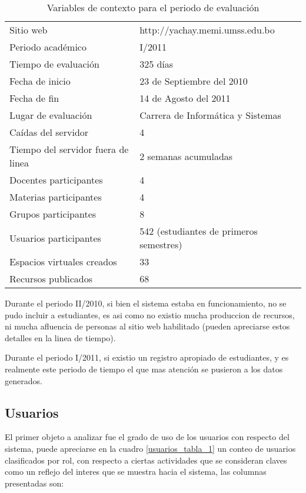 \begin{table}
\centering
\begin{tabular}{|l|l|}
\hline
Sitio web                          & http://yachay.memi.umss.edu.bo \\
Periodo académico                  & I/2011 \\
Tiempo de evaluación               & 325 días \\
Fecha de inicio                    & 23 de Septiembre del 2010 \\
Fecha de fin                       & 14 de Agosto del 2011 \\
Lugar de evaluación                & Carrera de Informática y Sistemas \\
Caídas del servidor                & 4 \\
Tiempo del servidor fuera de linea & 2 semanas acumuladas \\
Docentes participantes             & 4 \\
Materias participantes             & 4 \\
Grupos participantes               & 8 \\
Usuarios participantes             & 542 (estudiantes de primeros semestres) \\
Espacios virtuales creados         & 33 \\
Recursos publicados                & 68 \\
\hline
\end{tabular}
\caption{Variables de contexto para el periodo de evaluación}
\label{contexto}
\end{table}

Durante el periodo II/2010, si bien el sistema estaba en funcionamiento, no se
pudo incluir a estudiantes, es asi como no existio mucha produccion de recursos,
ni mucha afluencia de personas al sitio web habilitado (pueden apreciarse estos
detalles en la linea de tiempo).

Durante el periodo I/2011, si existio un registro apropiado de estudiantes, y es
realmente este periodo de tiempo el que mas atención se pusieron a los datos
generados.

\subsection{Usuarios}
El primer objeto a analizar fue el grado de uso de los usuarios con respecto del
sistema, puede apreciarse en la cuadro \ref{usuarios_tabla_1} un conteo de
usuarios clasificados por rol, con respecto a ciertas actividades que se consideran claves como un reflejo del interes que se muestra hacia el sistema, las
columnas presentadas son:

